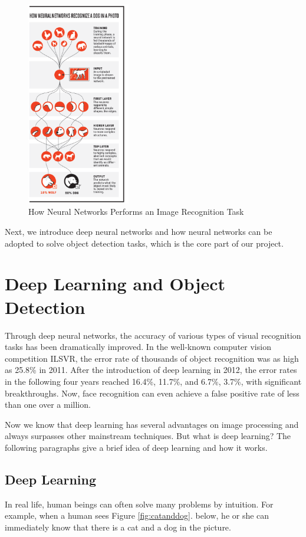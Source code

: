 \begin{figure}[h!]
\centering
\includegraphics[width=0.4\textwidth]{nnexample.pdf}
\caption{How Neural Networks Performs an Image Recognition Task \cite{parloff_2019}}
\label{fig:nnexample}
\end{figure}

Next, we introduce deep neural networks and how neural networks can be adopted to solve object detection tasks, which is the core part of our project.

\section{Deep Learning and Object Detection}

Through deep neural networks, the accuracy of various types of visual recognition tasks has been dramatically improved. In the well-known computer vision competition ILSVR, the error rate of thousands of object recognition was as high as 25.8\% in 2011. After the introduction of deep learning in 2012, the error rates in the following four years reached 16.4\%, 11.7\%, and 6.7\%, 3.7\%, with significant breakthroughs. Now, face recognition can even achieve a false positive rate of less than one over a million.

Now we know that deep learning has several advantages on image processing and always surpasses other mainstream techniques. But what is deep learning? The following paragraphs give a brief idea of deep learning and how it works.

\subsection{Deep Learning}
In real life, human beings can often solve many problems by intuition. For example, when a human sees Figure \ref{fig:catanddog}. below, he or she can immediately know that there is a cat and a dog in the picture.

